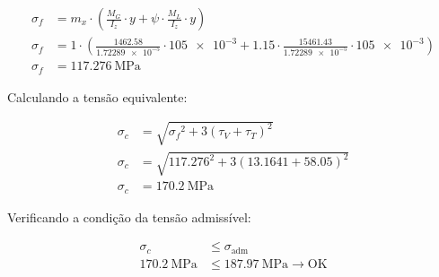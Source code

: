 \begin{align*}
  \sigma_f & = m_x \cdot \left( \frac{M_G}{I_z} \cdot y + \psi \cdot \frac{M_L}{I_z} \cdot y \right)                                                                          \\
  \sigma_f & = 1 \cdot \left( \frac{\num{1462.58}}{\num{1.72289e-5}} \cdot \num{105e-3} + \num{1.15} \cdot \frac{\num{15461.43}}{\num{1.72289e-5}} \cdot \num{105e-3} \right) \\
  \sigma_f & = \boxed{\SI{117.276}{\mega\pascal}}
\end{align*}

Calculando a tensão equivalente:

\begin{align*}
  \sigma_c & = \sqrt{{\sigma_f}^2 + 3 \left( \tau_V + \tau_T \right)^2 }                  \\
  \sigma_c & = \sqrt{{\num{117.276}}^2 + 3 \left( \num{13.1641} + \num{58.05} \right)^2 } \\
  \sigma_c & = \boxed{\SI{170.2}{\mega\pascal}}
\end{align*}

Verificando a condição da tensão admissível:

\begin{align*}
  \sigma_c                 & \leq \sigma_{\text{adm}}                             \\
  \SI{170.2}{\mega\pascal} & \leq \SI{187.97}{\mega\pascal} \rightarrow \text{OK}
\end{align*}

